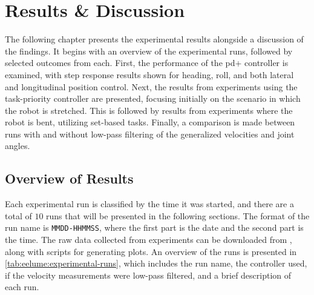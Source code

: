 \chapter{Results \& Discussion}
\label{ch:results}

The following chapter presents the experimental results alongside a discussion 
of the findings. It begins with an overview of the experimental runs, followed 
by selected outcomes from each. First, the performance of the \gls{pd+} controller 
is examined, with step response results shown for heading, roll, and both 
lateral and longitudinal position control. Next, the results from experiments using the 
task-priority controller are presented, focusing initially on the scenario in which the 
robot is stretched. This is followed by results from experiments where the 
robot is bent, utilizing set-based tasks. Finally, a comparison is 
made between runs with and without low-pass filtering of the generalized velocities
and joint angles.


\section{Overview of Results}

Each experimental run is classified by the time it was started, and there are a total
of \(10\) runs that will be presented in the following sections. The format
of the run name is \texttt{MMDD-HHMMSS}, where the first part is the date
and the second part is the time. The raw data collected from experiments can be
downloaded from \cite{githubdata}, along with scripts for generating plots.
An overview of the runs is presented in
\autoref{tab:eelume:experimental-runs}, which includes the run name, the
controller used, if the velocity measurements were low-pass filtered, and a
brief description of each run.

